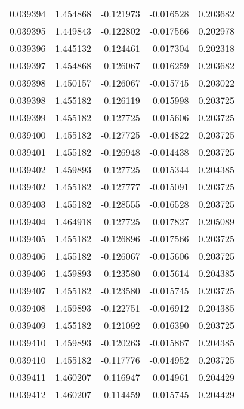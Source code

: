 \begin{tabular}{lrrrr}
0.039394    &  1.454868 & -0.121973 & -0.016528 &             0.203682 \\
0.039395    &  1.449843 & -0.122802 & -0.017566 &             0.202978 \\
0.039396    &  1.445132 & -0.124461 & -0.017304 &             0.202318 \\
0.039397    &  1.454868 & -0.126067 & -0.016259 &             0.203682 \\
0.039398    &  1.450157 & -0.126067 & -0.015745 &             0.203022 \\
0.039398    &  1.455182 & -0.126119 & -0.015998 &             0.203725 \\
0.039399    &  1.455182 & -0.127725 & -0.015606 &             0.203725 \\
0.039400    &  1.455182 & -0.127725 & -0.014822 &             0.203725 \\
0.039401    &  1.455182 & -0.126948 & -0.014438 &             0.203725 \\
0.039402    &  1.459893 & -0.127725 & -0.015344 &             0.204385 \\
0.039402    &  1.455182 & -0.127777 & -0.015091 &             0.203725 \\
0.039403    &  1.455182 & -0.128555 & -0.016528 &             0.203725 \\
0.039404    &  1.464918 & -0.127725 & -0.017827 &             0.205089 \\
0.039405    &  1.455182 & -0.126896 & -0.017566 &             0.203725 \\
0.039406    &  1.455182 & -0.126067 & -0.015606 &             0.203725 \\
0.039406    &  1.459893 & -0.123580 & -0.015614 &             0.204385 \\
0.039407    &  1.455182 & -0.123580 & -0.015745 &             0.203725 \\
0.039408    &  1.459893 & -0.122751 & -0.016912 &             0.204385 \\
0.039409    &  1.455182 & -0.121092 & -0.016390 &             0.203725 \\
0.039410    &  1.459893 & -0.120263 & -0.015867 &             0.204385 \\
0.039410    &  1.455182 & -0.117776 & -0.014952 &             0.203725 \\
0.039411    &  1.460207 & -0.116947 & -0.014961 &             0.204429 \\
0.039412    &  1.460207 & -0.114459 & -0.015745 &             0.204429 \\

\end{tabular}
